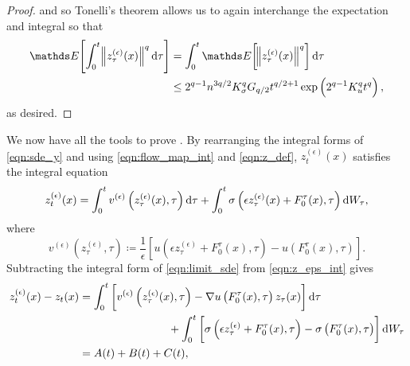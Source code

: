 \begin{proof}
	and so Tonelli's theorem allows us to again interchange the expectation and integral so that
	\begin{align*}
		\avg{\int_0^t{\norm{z_{\tau}^{(\epsilon)}(x)}^q\dif\tau}} & = \int_0^t{\avg{\norm{z_\tau^{(\epsilon)}(x)}^q}\dif\tau}                              \\
		                                                          & \leq 2^{q-1} n^{3q/2}K_\sigma^q G_{q/2} t^{q/2 + 1}\exp\left(2^{q-1} K_u^q t^q\right),
	\end{align*}
	as desired.
\end{proof}


We now have all the tools to prove .
By rearranging the integral forms of \eqref{eqn:sde_y} and using \eqref{eqn:flow_map_int} and \eqref{eqn:z_def}, \(z_t^{(\epsilon)}(x)\) satisfies the integral equation
\begin{equation}
	z_t^{(\epsilon)}(x) = \int_0^t{v^{(\epsilon)}\left(z_\tau^{(\epsilon)}(x), \tau\right)\dif\tau} + \int_0^t{\sigma\left(\epsilon z_\tau^{(\epsilon)}(x) + F_0^{\tau}(x),\tau\right) \dif W_\tau},
	\label{eqn:z_eps_int}
\end{equation}
where
\[
	v^{(\epsilon)}\left(z_\tau^{(\epsilon)}, \tau\right) \coloneqq \frac1\epsilon\left[u\left(\epsilon z_\tau^{(\epsilon)} + F_0^\tau(x), \tau\right) - u\left(F_0^\tau(x), \tau\right)\right].
\]
Subtracting the integral form of \eqref{eqn:limit_sde} from \eqref{eqn:z_eps_int} gives
\begin{align*}
	z_t^{(\epsilon)}(x) - z_t(x) & = \int_0^t{\left[v^{(\epsilon)}\left(z_\tau^{(\epsilon)}(x), \tau\right) - \nabla u\left(F_0^\tau(x), \tau\right) z_\tau(x)\right]\dif\tau}                                \\
	                             & \qquad\qquad\qquad\qquad + \int_0^t{\left[\sigma\left(\epsilon z_\tau^{(\epsilon)} + F_0^{\tau}(x),\tau\right) - \sigma \left(F_0^\tau(x), \tau\right)\right] \dif W_\tau} \\
	                             & = A(t) + B(t) + C(t),
\end{align*}
